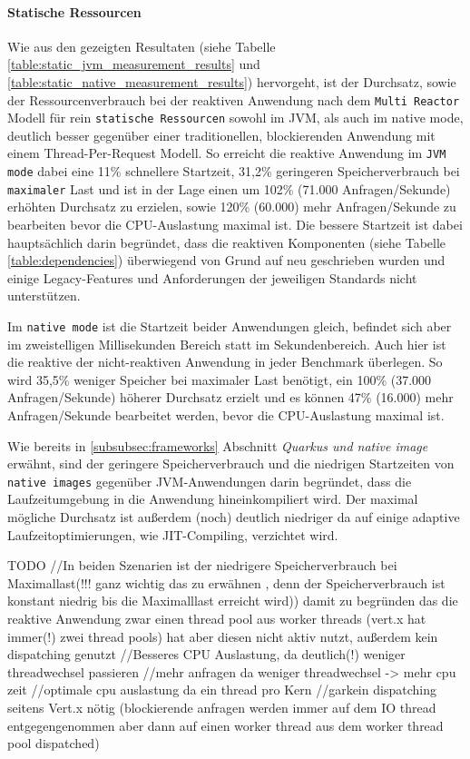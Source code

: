 \paragraph{Statische Ressourcen}
Wie aus den gezeigten Resultaten (siehe Tabelle \ref{table:static_jvm_measurement_results} und
\ref{table:static_native_measurement_results}) hervorgeht, ist der Durchsatz, sowie der Ressourcenverbrauch bei der
reaktiven Anwendung nach dem \verb|Multi Reactor| Modell für rein \verb|statische Ressourcen| sowohl im JVM, als auch im native mode,
deutlich besser gegenüber einer traditionellen, blockierenden Anwendung mit einem Thread-Per-Request Modell.
So erreicht die reaktive Anwendung im \verb|JVM mode| dabei eine 11\% schnellere Startzeit, 31,2\% geringeren Speicherverbrauch bei
\verb|maximaler| Last und ist in der Lage einen um 102\% (71.000 Anfragen/Sekunde) erhöhten Durchsatz zu erzielen,
sowie 120\% (60.000) mehr Anfragen/Sekunde zu bearbeiten bevor die CPU-Auslastung maximal ist.
Die bessere Startzeit ist dabei hauptsächlich darin begründet, dass die reaktiven Komponenten (siehe Tabelle \ref{table:dependencies})
überwiegend von Grund auf neu geschrieben wurden und einige Legacy-Features und Anforderungen der jeweiligen
Standards nicht unterstützen.

Im \verb|native mode| ist die Startzeit beider Anwendungen gleich, befindet sich aber im zweistelligen Millisekunden Bereich statt
im Sekundenbereich.
Auch hier ist die reaktive der nicht-reaktiven Anwendung in jeder Benchmark überlegen. So wird 35,5\% weniger Speicher bei maximaler Last
benötigt, ein 100\% (37.000 Anfragen/Sekunde) höherer  Durchsatz erzielt und es können 47\% (16.000) mehr Anfragen/Sekunde bearbeitet
werden, bevor die CPU-Auslastung maximal ist.

Wie bereits in \ref{subsubsec:frameworks} Abschnitt \textit{Quarkus und native image} erwähnt, sind der geringere Speicherverbrauch und
die niedrigen Startzeiten von \verb|native images| gegenüber JVM-Anwendungen darin begründet, dass die Laufzeitumgebung in die
Anwendung hineinkompiliert wird. Der maximal mögliche Durchsatz ist außerdem (noch) deutlich niedriger da auf einige adaptive
Laufzeitoptimierungen, wie JIT-Compiling, verzichtet wird.

TODO
//In beiden Szenarien ist der niedrigere Speicherverbrauch bei Maximallast(!!! ganz wichtig das zu erwähnen
, denn der Speicherverbrauch ist konstant niedrig bis die Maximalllast erreicht wird)) damit zu begründen das die reaktive Anwendung
zwar einen thread pool aus worker threads (vert.x hat immer(!) zwei thread pools) hat aber diesen nicht aktiv nutzt, außerdem
kein dispatching genutzt
//Besseres CPU Auslastung, da deutlich(!) weniger threadwechsel passieren
//mehr anfragen da weniger threadwechsel -> mehr cpu zeit
//optimale cpu auslastung da ein thread pro Kern
//garkein dispatching seitens Vert.x nötig (blockierende anfragen werden immer auf dem IO thread entgegengenommen aber dann auf einen
worker thread aus dem worker thread pool dispatched)

